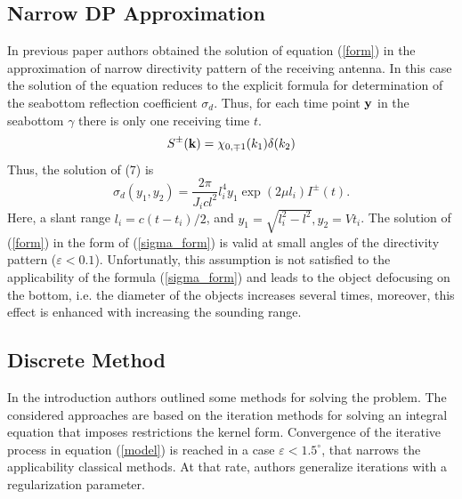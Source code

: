 \documentclass{procDDs}
\begin{document}
\subsection{Narrow DP Approximation}
In previous paper\cite{SPIE_KOV} authors obtained the solution of equation (\ref{form}) in the approximation of narrow directivity pattern of the receiving antenna. In this case the solution of the equation reduces to the explicit formula for determination of the  seabottom reflection coefficient $\sigma_d$. Thus, for each time point $\mathbf{y}$ in the seabottom $\gamma$ there is only one receiving time $t$.
\begin{equation}
S^{\pm}(\mathbf{k}) = \chi_{0,\mp1}(k_1)\delta(k_2)
\end{equation}
Thus, the solution of (7) is
\begin{equation}
\label{sigma_form}
\sigma_d \left( y_1, y_2 \right) = \frac{2\pi}{J_icl^2} l_i^4 y_1 \exp(2\mu l_i)I^\pm(t).
\end{equation}
Here, a slant range $l_i=c(t-t_i)/2$, and $y_1=\sqrt{l_i^2-l^2}, y_2=Vt_i$.
The solution of (\ref{form}) in the form of (\ref{sigma_form}) is valid at small angles of the directivity pattern ($\varepsilon<0.1$). Unfortunatly, this assumption is not satisfied to the applicability of the formula (\ref{sigma_form}) and leads to the object defocusing on the bottom, i.e. the diameter of the objects increases several times, moreover, this effect is enhanced with increasing the sounding range.

\subsection{Discrete Method}
In the introduction authors outlined some methods for solving the problem.  The considered approaches are based on the iteration methods for solving an integral equation that imposes restrictions the kernel form. Convergence of the iterative process in equation (\ref{model}) is reached in a case $\varepsilon < 1.5^\circ$, that narrows the applicability classical methods. At that rate, authors generalize iterations with a regularization parameter.
\end{document}
